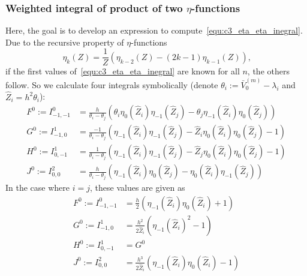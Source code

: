 \subsubsection{Weighted integral of product of two \texorpdfstring{$\eta$}{eta}-functions}

Here, the goal is to develop an expression to compute~\eqref{equ:c3_eta_eta_inegral}. Due to the recursive property of $\eta$-functions
$$
  \eta_k(Z) = \frac{1}{Z}\left(\eta_{k-2}(Z) - (2k-1)\eta_{k-1}(Z)  \right)\text{,}
$$
if the first values of~\eqref{equ:c3_eta_eta_inegral} are known for all $n$, the others follow. So we calculate four integrals symbolically (denote $\theta_i := \bar{V}_0^{(m)} -  \lambda_i$ and $\hat{Z}_i = h^2\theta_i$):
\begin{align*}
  F^0 := I_{-1,-1}^0 & = \frac{h}{\theta_i - \theta_j}\left(\theta_i \eta_0(\hat{Z}_i)\eta_{-1}(\hat{Z}_j) - \theta_j \eta_{-1}(\hat{Z}_i)\eta_0(\hat{Z}_j)\right)   \\
  G^0 := I_{-1, 0}^1 & = \frac{-1}{\theta_i - \theta_j}\left(\eta_{-1}(\hat{Z}_i)\eta_{-1}(\hat{Z}_j) - \hat{Z}_i \eta_{0}(\hat{Z}_i)\eta_{0}(\hat{Z}_j)  - 1\right) \\
  H^0 := I_{0, -1}^1 & = \frac{1}{\theta_i - \theta_j}\left(\eta_{-1}(\hat{Z}_i)\eta_{-1}(\hat{Z}_j) - \hat{Z}_j \eta_{0}(\hat{Z}_i)\eta_{0}(\hat{Z}_j)  - 1\right)  \\
  J^0 := I_{0,0}^{2} & = \frac{h}{\theta_i - \theta_j}\left(\eta_{-1}(\hat{Z}_i)\eta_{0}(\hat{Z}_j) - \eta_{0}(\hat{Z}_i)\eta_{-1}(\hat{Z}_j)\right)
\end{align*}
In the case where $i = j$, these values are given as
\begin{align*}
  F^0 := I_{-1,-1}^0 & = \frac{h}{2} \left(\eta_{-1}(\hat{Z}_i) \eta_{0}(\hat{Z}_i) + 1\right)             \\
  G^0 := I_{-1, 0}^1 & = \frac{h^2}{2 \hat{Z}_i} \left(\eta_{-1}(\hat{Z}_i)^2 - 1\right)                   \\
  H^0 := I_{0, -1}^1 & = G^0                                                                               \\
  J^0 := I_{0,0}^{2} & = \frac{h^3}{2 \hat{Z}_i} \left(\eta_{-1}(\hat{Z}_i) \eta_{0}(\hat{Z}_i) - 1\right)
\end{align*}


